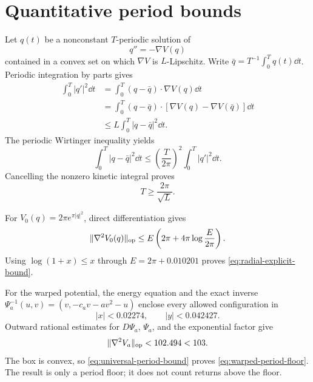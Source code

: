 \section{Quantitative period bounds}
\label{app:period-bounds}

Let \(q(t)\) be a nonconstant \(T\)-periodic solution of
\begin{equation}
 q''=-\nabla V(q)
 \label{eq:newton-equation}
\end{equation}
contained in a convex set on which \(\nabla V\) is \(L\)-Lipschitz.  Write
\(\bar q=T^{-1}\int_0^Tq(t)\dd t\).  Periodic integration by parts gives
\begin{align}
 \int_0^T|q'|^2\dd t
 &=\int_0^T(q-\bar q)\cdot\nabla V(q)\dd t\\
 &=\int_0^T(q-\bar q)\cdot
 [\nabla V(q)-\nabla V(\bar q)]\dd t\\
 &\le L\int_0^T|q-\bar q|^2\dd t.
 \label{eq:lipschitz-energy}
\end{align}
The periodic Wirtinger inequality yields
\begin{equation}
 \int_0^T|q-\bar q|^2\dd t
 \le\left(\frac{T}{2\pi}\right)^2
 \int_0^T|q'|^2\dd t.
 \label{eq:wirtinger}
\end{equation}
Cancelling the nonzero kinetic integral proves
\begin{equation}
 T\ge\frac{2\pi}{\sqrt L}.
 \label{eq:universal-period-bound}
\end{equation}

For \(V_0(q)=2\pi e^{\pi|q|^2}\), direct differentiation gives
\begin{equation}
 \|\nabla^2V_0(q)\|_{\rm op}
 \le E\left(2\pi+4\pi\log\frac{E}{2\pi}\right).
 \label{eq:radial-hessian-bound}
\end{equation}
Using \(\log(1+x)\le x\) through \(E=2\pi+0.010201\) proves
\cref{eq:radial-explicit-bound}.

For the warped potential, the energy equation and the exact inverse
\(\Psi_a^{-1}(u,v)=(v,-c_av-av^2-u)\) enclose every allowed configuration
in
\begin{equation}
 |x|<0.02274,
 \qquad |y|<0.042427.
 \label{eq:warped-config-box}
\end{equation}
Outward rational estimates for \(D\Psi_a\), \(\Psi_a\), and the exponential
factor give
\begin{equation}
 \|\nabla^2V_a\|_{\rm op}<102.494<103.
 \label{eq:warped-hessian-bound}
\end{equation}
The box is convex, so \cref{eq:universal-period-bound} proves
\cref{eq:warped-period-floor}.  The result is only a period floor; it does
not count returns above the floor.
